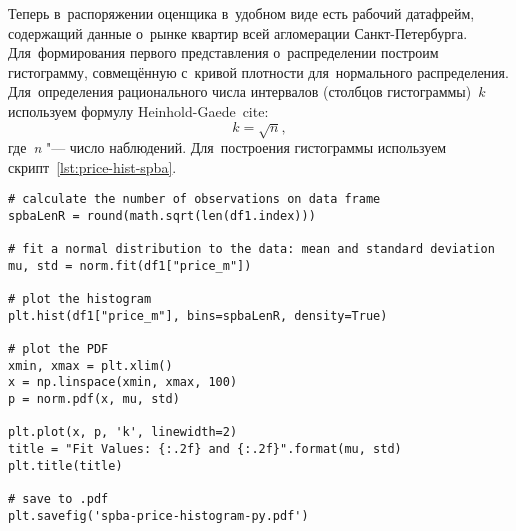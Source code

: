 \documentclass[]{scrartcl}
\begin{document}
Теперь в~распоряжении оценщика в~удобном виде есть рабочий датафрейм, содержащий данные о~рынке квартир всей агломерации Санкт-Петербурга. Для~формирования первого представления о~распределении построим гистограмму, совмещённую с~кривой плотности для~нормального распределения. Для~определения рационального числа интервалов (столбцов гистограммы)~$k$ используем формулу Heinhold-Gaede~cite\cite{Ingenieur-Statistik}:
\begin{equation}\label{eq:k-hist-Heinhold-Gaede}
k = \sqrt{n},
\end{equation}
где~\textit{n} "--- число наблюдений. Для~построения гистограммы используем скрипт~\ref{lst:price-hist-spba}.
%
\begin{lstlisting}[float, caption = Построение гистограммы для~агломерации Санкт-Петербурга, firstnumber=1, label= lst:price-hist-spba]
# calculate the number of observations on data frame
spbaLenR = round(math.sqrt(len(df1.index)))

# fit a normal distribution to the data: mean and standard deviation
mu, std = norm.fit(df1["price_m"])

# plot the histogram
plt.hist(df1["price_m"], bins=spbaLenR, density=True)

# plot the PDF
xmin, xmax = plt.xlim()
x = np.linspace(xmin, xmax, 100)
p = norm.pdf(x, mu, std)

plt.plot(x, p, 'k', linewidth=2)
title = "Fit Values: {:.2f} and {:.2f}".format(mu, std)
plt.title(title)

# save to .pdf
plt.savefig('spba-price-histogram-py.pdf')
\end{lstlisting}
%
\end{document}
